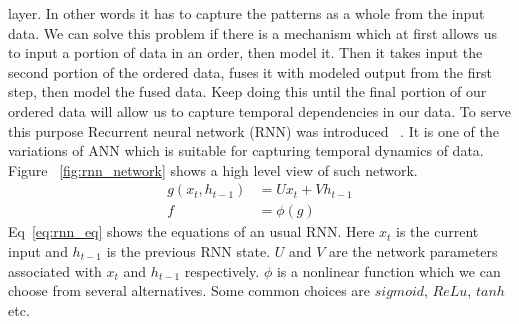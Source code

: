 \documentclass[10pt,twocolumn,letterpaper]{article}
\begin{document}
layer. In other words it has to capture the patterns as a whole from the input data. We can solve this problem if there is a mechanism which at first allows us to input a portion of data in an order, then model it. Then it takes input the second portion of the ordered data, fuses it with modeled output from the first step, then model the fused data. Keep doing this until the final portion of our ordered data will allow us to capture temporal dependencies in our data. To serve this purpose Recurrent neural network (RNN) was introduced ~\cite{DBLP:journals/corr/Lipton15}. It is one of the variations of ANN which is suitable for capturing temporal dynamics of data. Figure ~\ref{fig:rnn_network} shows a high level view of such network. 
\begin{equation}
\label{eq:rnn_eq}
\begin{aligned}
	g(x_t, h_{t-1}) & = Ux_t + Vh_{t-1} \\ f & = \phi(g)
\end{aligned}
\end{equation}
Eq~\ref{eq:rnn_eq} shows the equations of an usual RNN. Here $x_t$ is the current input and $h_{t-1}$ is the previous RNN state. $U$ and $V$ are the network parameters associated with $x_t$ and $h_{t-1}$ respectively. $\phi$ is a nonlinear function which we can choose from several alternatives. Some common choices are $sigmoid$, $ReLu$, $tanh$ etc.
\end{document}
